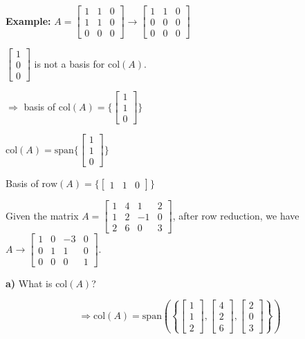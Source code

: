 \documentclass{article}
\begin{document}
\textbf{Example:} \( A = \begin{bmatrix} 1 & 1 & 0 \\ 1 & 1 & 0 \\ 0 & 0 & 0 \end{bmatrix} \rightarrow \begin{bmatrix} 1 & 1 & 0 \\ 0 & 0 & 0 \\ 0 & 0 & 0 \end{bmatrix} \)

\( \begin{bmatrix} 1 \\ 0 \\ 0 \end{bmatrix} \) is not a basis for \( \text{col}(A) \).

\( \Rightarrow \) basis of \( \text{col}(A) = \{ \begin{bmatrix} 1 \\ 1 \\ 0 \end{bmatrix} \} \)

\( \text{col}(A) = \text{span} \{ \begin{bmatrix} 1 \\ 1 \\ 0 \end{bmatrix} \} \)

Basis of \( \text{row}(A) = \{ \begin{bmatrix} 1 & 1 & 0 \end{bmatrix} \} \)


Given the matrix \( A = \begin{bmatrix} 1 & 4 & 1 & 2 \\ 1 & 2 & -1 & 0 \\ 2 & 6 & 0 & 3 \end{bmatrix} \), after row reduction, we have \( A \rightarrow \begin{bmatrix} 1 & 0 & -3 & 0 \\ 0 & 1 & 1 & 0 \\ 0 & 0 & 0 & 1 \end{bmatrix} \). 

\textbf{a)} What is \( \text{col}(A) \)?

\[
\Rightarrow \text{col}(A) = \text{span} \left( \left\{ \begin{bmatrix} 1 \\ 1 \\ 2 \end{bmatrix}, \begin{bmatrix} 4 \\ 2 \\ 6 \end{bmatrix}, \begin{bmatrix} 2 \\ 0 \\ 3 \end{bmatrix} \right\} \right)
\]
\end{document}
